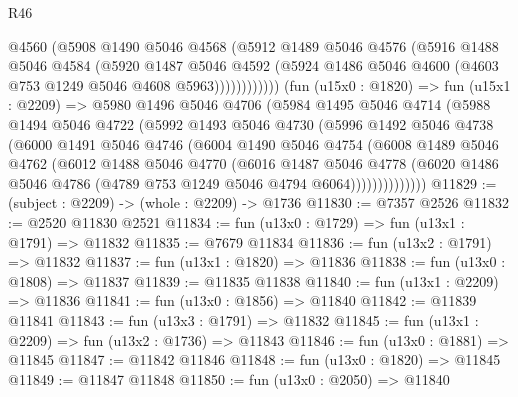 \begin{lexlean}{R46}
\begin{coremodule}
                    @4560
                    (@5908
                      @1490
                      @5046
                      @4568
                      (@5912
                        @1489
                        @5046
                        @4576
                        (@5916
                          @1488
                          @5046
                          @4584
                          (@5920
                            @1487
                            @5046
                            @4592
                            (@5924 @1486 @5046 @4600 (@4603 @753 @1249 @5046 @4608 @5963))))))))))))
        (fun (u15x0 : @1820) =>
        fun (u15x1 : @2209) =>
        @5980
          @1496
          @5046
          @4706
          (@5984
            @1495
            @5046
            @4714
            (@5988
              @1494
              @5046
              @4722
              (@5992
                @1493
                @5046
                @4730
                (@5996
                  @1492
                  @5046
                  @4738
                  (@6000
                    @1491
                    @5046
                    @4746
                    (@6004
                      @1490
                      @5046
                      @4754
                      (@6008
                        @1489
                        @5046
                        @4762
                        (@6012
                          @1488
                          @5046
                          @4770
                          (@6016
                            @1487
                            @5046
                            @4778
                            (@6020
                              @1486
                              @5046
                              @4786
                              (@4789 @753 @1249 @5046 @4794 @6064))))))))))))))
@11829 := (subject : @2209) -> (whole : @2209) -> @1736
@11830 := @7357 @2526
@11832 := @2520 @11830 @2521
@11834 := fun (u13x0 : @1729) => fun (u13x1 : @1791) => @11832
@11835 := @7679 @11834
@11836 := fun (u13x2 : @1791) => @11832
@11837 := fun (u13x1 : @1820) => @11836
@11838 := fun (u13x0 : @1808) => @11837
@11839 := @11835 @11838
@11840 := fun (u13x1 : @2209) => @11836
@11841 := fun (u13x0 : @1856) => @11840
@11842 := @11839 @11841
@11843 := fun (u13x3 : @1791) => @11832
@11845 := fun (u13x1 : @2209) => fun (u13x2 : @1736) => @11843
@11846 := fun (u13x0 : @1881) => @11845
@11847 := @11842 @11846
@11848 := fun (u13x0 : @1820) => @11845
@11849 := @11847 @11848
@11850 := fun (u13x0 : @2050) => @11840

\end{coremodule}
\end{lexlean}
